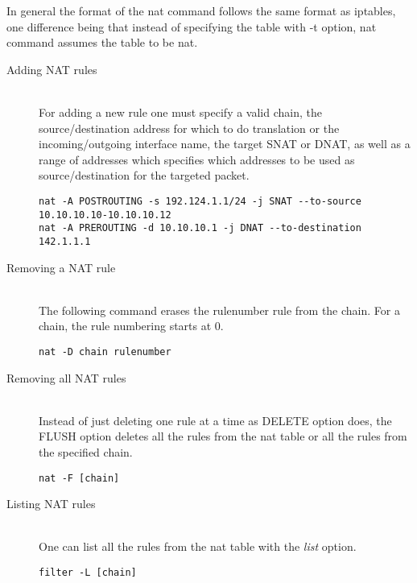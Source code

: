{{In general the format of the nat command follows the same format as iptables, one difference being that 
instead of specifying the table with -t option, nat command assumes the table to be nat. 
\begin{description}
\item [Adding NAT rules] \hfill \\
For adding a new rule one must specify a valid chain, the source/destination address for which to do 
translation or the incoming/outgoing interface name, the target SNAT or DNAT, as well as a range of 
addresses which specifies which addresses to be used as source/destination for the targeted packet.
\lstset{language=TeX,caption=Adding a NAT rule,label=lst:saddrule}
\begin{lstlisting}
nat -A POSTROUTING -s 192.124.1.1/24 -j SNAT --to-source 10.10.10.10-10.10.10.12
nat -A PREROUTING -d 10.10.10.1 -j DNAT --to-destination 142.1.1.1
\end{lstlisting}
\item[Removing a NAT rule] \hfill \\
The following command erases the rulenumber rule from the chain. For a chain, the rule numbering starts at 0.
\lstset{language=TeX,caption=Deleting a NAT rule,label=lst:sdelrule}
\begin{lstlisting}
nat -D chain rulenumber
\end{lstlisting}
\item[Removing all NAT rules] \hfill \\
Instead of just deleting one rule at a time as DELETE option does, the FLUSH option deletes all the rules from the nat table or all the rules from the specified chain.
\lstset{language=TeX,caption=Deleting more NAT rules,label=lst:sdelallrules}
\begin{lstlisting}
nat -F [chain]
\end{lstlisting}
\item [Listing NAT rules] \hfill \\
One can list all the rules from the nat table with the \textit{list} option.
\lstset{language=TeX,caption=List NAT rules,label=lst:slstrule}
\begin{lstlisting}
filter -L [chain]
\end{lstlisting}
\end{description}

}}
